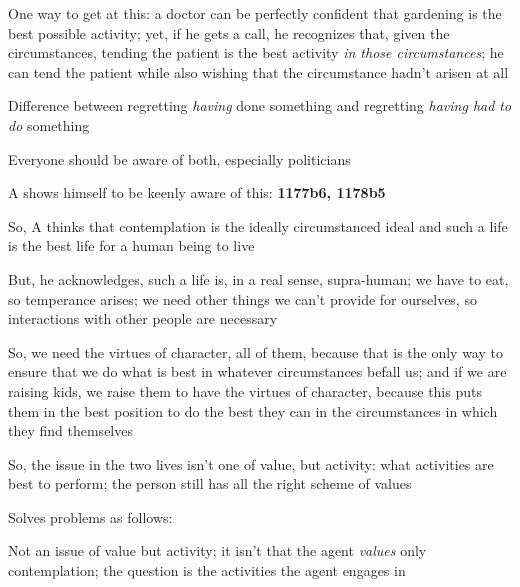 \documentclass[11pt]{article}
\begin{document}
\noindent One way to get at this: a doctor can be perfectly confident that gardening is the best possible activity; yet, if he gets a call, he recognizes that, given the circumstances, tending the patient is the best activity \emph{in those circumstances}; he can tend the patient while also wishing that the circumstance hadn't arisen at all
\vspace*{2mm}

\noindent Difference between regretting \emph{having} done something and regretting \emph{having had to do} something
\vspace*{2mm}

\noindent Everyone should be aware of both, especially politicians
\vspace*{2mm}

\noindent A shows himself to be keenly aware of this: \textbf{1177b6, 1178b5}
\vspace*{2mm}

\noindent So, A thinks that contemplation is the ideally circumstanced ideal and such a life is the best life for a human being to live
\vspace*{2mm}

\noindent But, he acknowledges, such a life is, in a real sense, supra-human; we have to eat, so temperance arises; we need other things we can't provide for ourselves, so interactions with other people are necessary
\vspace*{2mm}

\noindent So, we need the virtues of character, all of them, because that is the only way to ensure that we do what is best in whatever circumstances befall us; and if we are raising kids, we raise them to have the virtues of character, because this puts them in the best position to do the best they can in the circumstances in which they find themselves
\vspace*{2mm}

\noindent So, the issue in the two lives isn't one of value, but activity: what activities are best to perform; the person still has all the right scheme of values
\vspace*{2mm}

\noindent Solves problems as follows:
\vspace*{2mm}

\noindent [1] Not an issue of value but activity; it isn't that the agent \emph{values} only contemplation; the question is the activities the agent engages in
\vspace*{2mm}
\end{document}
